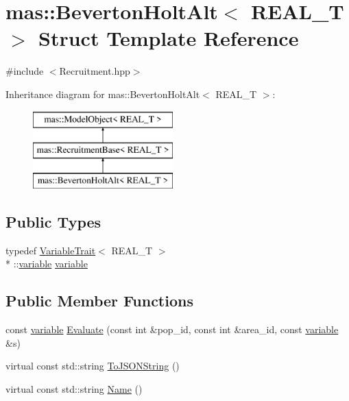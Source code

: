 \hypertarget{structmas_1_1_beverton_holt_alt}{\section{mas\-:\-:Beverton\-Holt\-Alt$<$ R\-E\-A\-L\-\_\-\-T $>$ Struct Template Reference}
\label{structmas_1_1_beverton_holt_alt}
}


{\ttfamily \#include $<$Recruitment.\-hpp$>$}

Inheritance diagram for mas\-:\-:Beverton\-Holt\-Alt$<$ R\-E\-A\-L\-\_\-\-T $>$\-:\begin{figure}[H]
\begin{center}
\leavevmode
\includegraphics[height=3.000000cm]{structmas_1_1_beverton_holt_alt}
\end{center}
\end{figure}
\subsection*{Public Types}
\begin{DoxyCompactItemize}
\item 
typedef \hyperlink{structmas_1_1_variable_trait}{Variable\-Trait}$<$ R\-E\-A\-L\-\_\-\-T $>$\\*
\-::\hyperlink{structmas_1_1_model_object_a4e62fdbb5826f8fac311262b888ab10a}{variable} \hyperlink{structmas_1_1_beverton_holt_alt_a6d29c249aa28715df57bfe1d7e3c2709}{variable}
\end{DoxyCompactItemize}
\subsection*{Public Member Functions}
\begin{DoxyCompactItemize}
\item 
const \hyperlink{structmas_1_1_model_object_a4e62fdbb5826f8fac311262b888ab10a}{variable} \hyperlink{structmas_1_1_beverton_holt_alt_abce4e13656f770710ed047efa1e78ae0}{Evaluate} (const int \&pop\-\_\-id, const int \&area\-\_\-id, const \hyperlink{structmas_1_1_model_object_a4e62fdbb5826f8fac311262b888ab10a}{variable} \&s)
\item 
virtual const std\-::string \hyperlink{structmas_1_1_beverton_holt_alt_ae81da66f21c345daabf90fc7aa0db6c7}{To\-J\-S\-O\-N\-String} ()
\item 
virtual const std\-::string \hyperlink{structmas_1_1_beverton_holt_alt_a69b3da75fcea33be0ce8b12f6448b3b0}{Name} ()
\end{DoxyCompactItemize}
